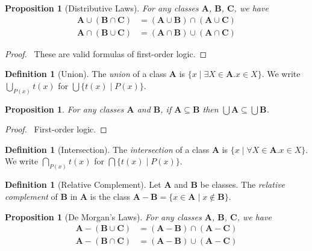 \documentclass{book}
\let\qed\relax
\newtheorem{prop}[ax]{Proposition}
\theoremstyle{definition}
\newtheorem{df}[ax]{Definition}
\begin{document}
\begin{prop}[Distributive Laws]
For any classes $\mathbf{A}$, $\mathbf{B}$, $\mathbf{C}$, we have
\begin{align*}
\mathbf{A} \cup (\mathbf{B} \cap \mathbf{C}) & = (\mathbf{A} \cup \mathbf{B}) \cap (\mathbf{A} \cup \mathbf{C}) \\
\mathbf{A} \cap (\mathbf{B} \cup \mathbf{C}) & = (\mathbf{A} \cap \mathbf{B}) \cup (\mathbf{A} \cap \mathbf{C})
\end{align*}
\end{prop}

\begin{proof}
\pf\ These are valid formulas of first-order logic. \qed
\end{proof}

\begin{df}[Union]
The \emph{union} of a class $\mathbf{A}$ is $\{ x \mid \exists X \in \mathbf{A}. x \in X\}$.
We write $\bigcup_{P(x)} t(x)$ for $\bigcup \{ t(x) \mid P(x) \}$.
\end{df}

\begin{prop}
For any classes $\mathbf{A}$ and $\mathbf{B}$, if $\mathbf{A} \subseteq \mathbf{B}$ then $\bigcup \mathbf{A} \subseteq \bigcup \mathbf{B}$.
\end{prop}

\begin{proof}
\pf\ First-order logic. \qed
\end{proof}

\begin{df}[Intersection]
The \emph{intersection} of a class $\mathbf{A}$ is $\{ x \mid \forall X \in \mathbf{A}. x \in X \}$. We write $\bigcap_{P(x)} t(x)$ for $\bigcap \{ t(x) \mid P(x) \}$.
\end{df}

\begin{df}[Relative Complement]
Let $\mathbf{A}$ and $\mathbf{B}$ be classes. The \emph{relative complement} of $\mathbf{B}$ in $\mathbf{A}$ is the class $\mathbf{A} - \mathbf{B} = \{ x \in \mathbf{A} \mid x \notin \mathbf{B} \}$.
\end{df}

\begin{prop}[De Morgan's Laws]
For any classes $\mathbf{A}$, $\mathbf{B}$, $\mathbf{C}$, we have
\begin{align*}
\mathbf{A} - (\mathbf{B} \cup \mathbf{C}) & = (\mathbf{A} - \mathbf{B}) \cap (\mathbf{A} - \mathbf{C}) \\
\mathbf{A} - (\mathbf{B} \cap \mathbf{C}) & = (\mathbf{A} - \mathbf{B}) \cup (\mathbf{A} - \mathbf{C})
\end{align*}
\end{prop}
\end{document}
